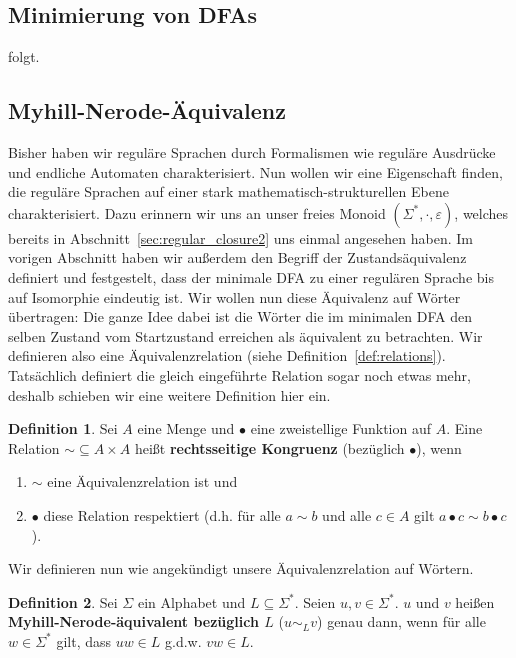 \documentclass[11pt, a4paper]{article}
\theoremstyle{definition}
\newtheorem{definition}{Definition}[section]
\theoremstyle{plain}
\numberwithin{equation}{section}
\begin{document}
\subsection{Minimierung von DFAs}\label{sec:regular_minimization}
folgt. %


\subsection{Myhill-Nerode-Äquivalenz}\label{sec:regular_myhill-nerode}
Bisher haben wir reguläre Sprachen durch Formalismen wie reguläre Ausdrücke und endliche Automaten charakterisiert. Nun wollen wir eine Eigenschaft finden, die reguläre Sprachen auf einer stark mathematisch-strukturellen Ebene charakterisiert. Dazu erinnern wir uns an unser freies Monoid \( (\Sigma^\ast, \cdot, \varepsilon) \), welches bereits in Abschnitt~\ref{sec:regular_closure2} uns einmal angesehen haben. Im vorigen Abschnitt haben wir außerdem den Begriff der Zustandsäquivalenz definiert und festgestelt, dass der minimale DFA zu einer regulären Sprache bis auf Isomorphie eindeutig ist. Wir wollen nun diese Äquivalenz auf Wörter übertragen: Die ganze Idee dabei ist die Wörter die im minimalen DFA den selben Zustand vom Startzustand erreichen als äquivalent zu betrachten. Wir definieren also eine Äquivalenzrelation (siehe Definition~\ref{def:relations}). Tatsächlich definiert die gleich eingeführte Relation sogar noch etwas mehr, deshalb schieben wir eine weitere Definition hier ein.
\begin{definition}
	Sei \( A \) eine Menge und \( \bullet \) eine zweistellige Funktion auf \( A \). Eine Relation \( \sim \subseteq A \times A \) heißt \textbf{rechtsseitige Kongruenz} (bezüglich \( \bullet \)), wenn
	\begin{enumerate}
		\item \( \sim \) eine Äquivalenzrelation ist und
		\item \( \bullet \) diese Relation respektiert (d.h. für alle \( a \sim b \) und alle \( c \in A \) gilt \( a \bullet c \sim b \bullet c \)).
	\end{enumerate}
\end{definition}
Wir definieren nun wie angekündigt unsere Äquivalenzrelation auf Wörtern.
\begin{definition}
	Sei \( \Sigma \) ein Alphabet und \( L \subseteq \Sigma^\ast \). Seien \( u, v \in \Sigma^\ast \). \( u \) und \( v \) heißen \textbf{Myhill-Nerode-äquivalent bezüglich \( L \)} (\( u \sim_L v \)) genau dann, wenn für alle \( w \in \Sigma^\ast \) gilt, dass \( uw \in L \) g.d.w. \( vw \in L \).
\end{definition}
\end{document}
